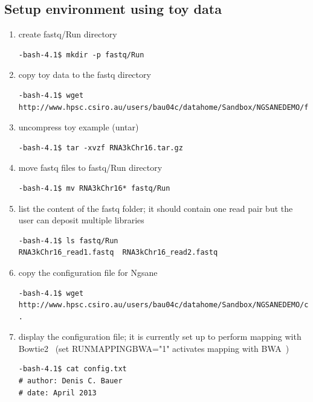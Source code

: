 \documentclass{article}
\newcommand{\prog}{{\sc Ngsane}}
\begin{document}
\subsection{Setup environment using toy data}
\begin{enumerate}
\item  create fastq/Run directory
\begin{small}\begin{verbatim}
-bash-4.1$ mkdir -p fastq/Run
\end{verbatim}\end{small}
\item  copy toy data to the fastq directory
\begin{small}\begin{verbatim}
-bash-4.1$ wget http://www.hpsc.csiro.au/users/bau04c/datahome/Sandbox/NGSANEDEMO/fastq/Run/RNA3kChr16.tar.gz
\end{verbatim}\end{small}
\item uncompress toy example (untar)
\begin{small}\begin{verbatim}
-bash-4.1$ tar -xvzf RNA3kChr16.tar.gz
\end{verbatim}\end{small}
\item move fastq files to fastq/Run directory 
\begin{small}\begin{verbatim}
-bash-4.1$ mv RNA3kChr16* fastq/Run
\end{verbatim}\end{small}
\item list the content of the fastq folder; it should contain one read pair but the user can deposit multiple libraries
\begin{small}\begin{verbatim}
-bash-4.1$ ls fastq/Run
RNA3kChr16_read1.fastq  RNA3kChr16_read2.fastq
\end{verbatim}\end{small}
\item copy the configuration file for \prog
\begin{small}\begin{verbatim}
-bash-4.1$ wget http://www.hpsc.csiro.au/users/bau04c/datahome/Sandbox/NGSANEDEMO/config.txt .
\end{verbatim}\end{small}
\item display the configuration file; it is currently  set up to perform mapping with Bowtie2~\citep{Langmead2012} (set RUNMAPPINGBWA="1" activates mapping with BWA~\citep{Li2009})
\begin{small}\begin{verbatim}
-bash-4.1$ cat config.txt
# author: Denis C. Bauer
# date: April 2013


\end{verbatim}
\end{small}
\end{enumerate}
\end{document}
